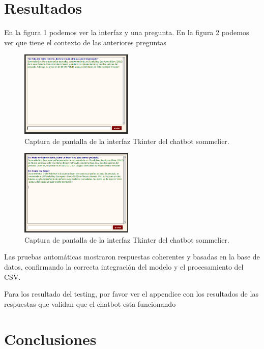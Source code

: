 \documentclass[conference]{IEEEtran}
\begin{document}
\section{Resultados}
En la figura 1 podemos ver la interfaz y una pregunta.
En la figura 2 podemos ver que tiene el contexto de las anteriores preguntas
\begin{figure}[htbp]
\centerline{\includegraphics[width=0.48\textwidth]{./figures/2025-06-01-100101_701x537_scrot.png}}
\caption{Captura de pantalla de la interfaz Tkinter del chatbot sommelier.}
\label{fig:interfaz}
\end{figure}

\begin{figure}[ht]
\centerline{\includegraphics[width=0.48\textwidth]{./figures/2025-06-01-100135_696x533_scrot.png}}
\caption{Captura de pantalla de la interfaz Tkinter del chatbot sommelier.}
\label{memory}
\end{figure}

Las pruebas automáticas mostraron respuestas coherentes y basadas en la base de
datos, confirmando la correcta integración del modelo y el procesamiento del
CSV.

Para los resultado del testing, por favor ver el appendice con los resultados
de las respuestas que validan que el chatbot esta funcionando

\section{Conclusiones}
\end{document}
